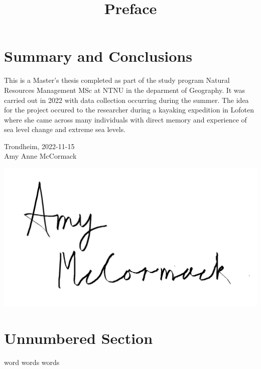 \documentclass{article}
\begin{document}

\section*{Summary and Conclusions}

\title{Preface}
This is a Master's thesis completed as part of the study program Natural Resources Management MSc at NTNU in the deparment of Geography. It was carried out in 2022 with data collection occurring during the summer. The idea for the project occured to the researcher during a kayaking expedition in Lofoten where she came across many individuals with direct memory and experience of sea level change and extreme sea levels. \\[2cm]

\begin{center}
Trondheim, 2022-11-15\\[1pc]


Amy Anne McCormack 
\end{center}



\graphicspath{ {./images/} }
\includegraphics[scale=0.5]{fig/to use signature png}

\tableofcontents

\section*{Unnumbered Section}



\listoffigures
\listoftables
\clearpage
{}

word words words
\end{document}
